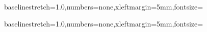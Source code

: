 












\newcommand{\somecode}[1]{\DefineShortVerb{\|}\SaveVerb{text}|#1|\UseVerb{text}\UndefineShortVerb{\|}}

%
{baselinestretch=1.0,numbers=none,xleftmargin=5mm,fontsize=\small}

%
{baselinestretch=1.0,numbers=none,xleftmargin=5mm,fontsize=\small}

\newcommand{\inputcppfile}[1]{%
  \VerbatimInput[baselinestretch=1.0,numbers=none,xleftmargin=5mm, fontseries=b, fontsize=\small]{#1}
}

\newcommand{\inputcppfilestrippedheader}[1]{%
  \VerbatimInput[baselinestretch=1.0,numbers=none,xleftmargin=5mm, fontseries=b, fontsize=\small,firstline=28]{#1}
}


%




